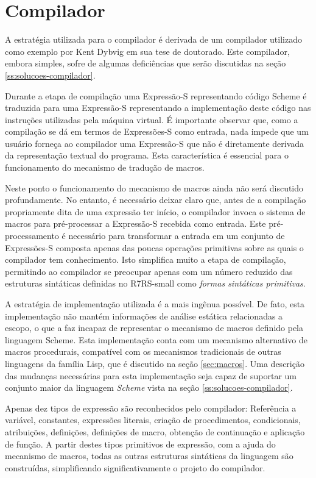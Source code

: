 \section{Compilador}
\label{sec:compilador}

A estratégia utilizada para o compilador é derivada de um compilador utilizado
como exemplo por Kent Dybvig em sua tese de doutorado\cite{3imp}. Este compilador,
embora simples, sofre de algumas deficiências que serão discutidas na seção
\ref{ss:solucoes-compilador}.

Durante a etapa de compilação uma Expressão-S representando código Scheme é
traduzida para uma Expressão-S representando a implementação deste código nas
instruções utilizadas pela máquina virtual. É importante observar que, como a compilação se
dá em termos de Expressões-S como entrada, nada impede que um usuário forneça
ao compilador uma Expressão-S que não é diretamente derivada da representação
textual do programa. Esta característica é essencial para o funcionamento do
mecanismo de tradução de macros.

Neste ponto o funcionamento do mecanismo de macros ainda não será discutido
profundamente. No entanto, é necessário deixar claro que, antes de a compilação
propriamente dita de uma expressão ter início, o compilador invoca o sistema de
macros para pré-processar a Expressão-S recebida como entrada. Este
pré-processamento é necessário para transformar a entrada em um conjunto de
Expressões-S composta apenas das poucas operações primitivas sobre as quais o
compilador tem conhecimento. Isto simplifica muito a etapa de compilação,
permitindo ao compilador se preocupar apenas com um número reduzido das
estruturas sintáticas definidas no R7RS-small como \textit{formas sintáticas
primitivas}.

A estratégia de implementação utilizada é a mais ingênua possível. De fato,
esta implementação não mantém informações de análise estática relacionadas a
escopo, o que a faz incapaz de representar o mecanismo de macros definido pela
linguagem Scheme. Esta implementação conta com um mecanismo alternativo de
macros procedurais, compatível com os mecanismos tradicionais de outras
linguagens da família Lisp, que é discutido na seção \ref{sec:macros}. Uma
descrição das mudanças necessárias para esta implementação seja capaz de 
suportar um conjunto maior da linguagem \textit{Scheme}
vista na seção \ref{ss:solucoes-compilador}.

Apenas dez tipos de expressão são reconhecidos pelo compilador: Referência a variável,
constantes,  expressões literais, criação de procedimentos, condicionais,
atribuições, definições, definições de macro, obtenção de continuação e
aplicação de função. A partir destes tipos primitivos de expressão, com a ajuda
do mecanismo de macros, todas as outras estruturas sintáticas da linguagem são
construídas, simplificando significativamente o projeto do compilador.

